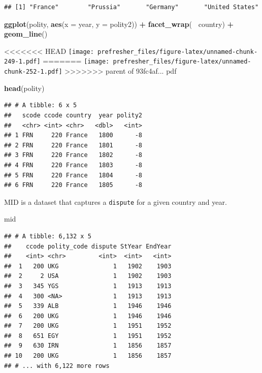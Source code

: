 \documentclass[]{book}
\newenvironment{Shaded}{\begin{snugshade}}{\end{snugshade}}
\newcommand{\DataTypeTok}[1]{\textcolor[rgb]{0.13,0.29,0.53}{#1}}
\newcommand{\KeywordTok}[1]{\textcolor[rgb]{0.13,0.29,0.53}{\textbf{#1}}}
\newcommand{\NormalTok}[1]{#1}
\newcommand{\OperatorTok}[1]{\textcolor[rgb]{0.81,0.36,0.00}{\textbf{#1}}}
\newcommand{\StringTok}[1]{\textcolor[rgb]{0.31,0.60,0.02}{#1}}
\theoremstyle{definition}
\theoremstyle{definition}
\theoremstyle{definition}
\theoremstyle{remark}
\begin{document}
\begin{Shaded}
\begin{Highlighting}[]
\begin{Shaded}
\begin{Highlighting}[]
\begin{Shaded}
\begin{Highlighting}[]
\begin{verbatim}
## [1] "France"        "Prussia"       "Germany"       "United States"
\end{verbatim}

\begin{Shaded}
\begin{Highlighting}[]
\KeywordTok{ggplot}\NormalTok{(polity, }\KeywordTok{aes}\NormalTok{(}\DataTypeTok{x =}\NormalTok{ year, }\DataTypeTok{y =}\NormalTok{ polity2)) }\OperatorTok{+}
\StringTok{  }\KeywordTok{facet_wrap}\NormalTok{(}\OperatorTok{~}\StringTok{ }\NormalTok{country) }\OperatorTok{+}
\StringTok{  }\KeywordTok{geom_line}\NormalTok{()}
\end{Highlighting}
\end{Shaded}

<<<<<<< HEAD
\texttt{[image: prefresher\_files/figure-latex/unnamed-chunk-249-1.pdf]}
=======
\texttt{[image: prefresher\_files/figure-latex/unnamed-chunk-252-1.pdf]}
>>>>>>> parent of 93fc4af... pdf

\begin{Shaded}
\begin{Highlighting}[]
\KeywordTok{head}\NormalTok{(polity)}
\end{Highlighting}
\end{Shaded}

\begin{verbatim}
## # A tibble: 6 x 5
##   scode ccode country  year polity2
##   <chr> <int> <chr>   <dbl>   <int>
## 1 FRN     220 France   1800      -8
## 2 FRN     220 France   1801      -8
## 3 FRN     220 France   1802      -8
## 4 FRN     220 France   1803      -8
## 5 FRN     220 France   1804      -8
## 6 FRN     220 France   1805      -8
\end{verbatim}

MID is a dataset that captures a \texttt{dispute} for a given country and year.

\begin{Shaded}
\begin{Highlighting}[]
\NormalTok{mid}
\end{Highlighting}
\end{Shaded}

\begin{verbatim}
## # A tibble: 6,132 x 5
##    ccode polity_code dispute StYear EndYear
##    <int> <chr>         <int>  <int>   <int>
##  1   200 UKG               1   1902    1903
##  2     2 USA               1   1902    1903
##  3   345 YGS               1   1913    1913
##  4   300 <NA>              1   1913    1913
##  5   339 ALB               1   1946    1946
##  6   200 UKG               1   1946    1946
##  7   200 UKG               1   1951    1952
##  8   651 EGY               1   1951    1952
##  9   630 IRN               1   1856    1857
## 10   200 UKG               1   1856    1857
## # ... with 6,122 more rows
\end{verbatim}


\end{Highlighting}
\end{Shaded}
\end{Highlighting}
\end{Shaded}
\end{Highlighting}
\end{Shaded}
\end{document}
